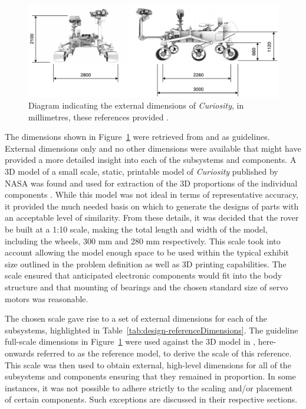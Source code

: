       \begin{figure}[h]
        \centering
        \includegraphics[width=0.9\linewidth]{figures/mechDesign-curiosityDimensions}
        \caption[Diagram indicating the external dimensions of \textit{Curiosity}, in millimetres, these references provided.]{Diagram indicating the external dimensions of \textit{Curiosity}, in millimetres, these references provided \cite{nasa3D}.}
        \label{fig:mechdesign-curiosityDimensions}
      \end{figure}
      
      The dimensions shown in Figure~\ref{fig:mechdesign-curiosityDimensions} were retrieved from \cite{nasajulypresskit} and \cite{roverThermal_2016} as guidelines. External dimensions only and no other dimensions were available that might have provided a more detailed insight into each of the subsystems and components. A 3D model of a small scale, static, printable model of \textit{Curiosity} published by NASA was found and used for extraction of the 3D proportions of the individual components \cite{nasa3Dprint}. While this model was not ideal in terms of representative accuracy, it provided the much needed basis on which to generate the designs of parts with an acceptable level of similarity. From these details, it was decided that the rover be built at a 1:10 scale, making the total length and width of the model, including the wheels, 300 mm and 280 mm respectively. This scale took into account allowing the model enough space to be used within the typical exhibit size outlined in the problem definition as well as 3D printing capabilities. The scale ensured that anticipated electronic components would fit into the body structure and that mounting of bearings and the chosen standard size of servo motors was reasonable.
      
      The chosen scale gave rise to a set of external dimensions for each of the subsystems, highlighted in Table~\ref{tab:design-referenceDimensions}. The guideline full-scale dimensions in Figure~\ref{fig:mechdesign-curiosityDimensions} were used against the 3D model in \cite{nasa3Dprint}, here-onwards referred to as the reference model, to derive the scale of this reference. This scale was then used to obtain external, high-level dimensions for all of the subsystems and components ensuring that they remained in proportion. In some instances, it was not possible to adhere strictly to the scaling and/or placement of certain components. Such exceptions are discussed in their respective sections.
            
